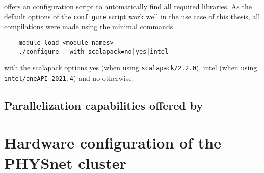 \documentclass[main.tex]{subfiles}
\begin{document}
\QE offers an configuration script to automatically find all required libraries.
As the default options of the \texttt{configure} script work well in the use case of this thesis, all compilations were made using the minimal commands
\begin{verbatim}
    module load <module names>
    ./configure --with-scalapack=no|yes|intel
\end{verbatim}
with the scalapack options yes (when using \texttt{scalapack/2.2.0}), intel (when using \\ \texttt{intel/oneAPI-2021.4}) and no otherwise.




\subsection{Parallelization capabilities offered by \QE}\label{sub:qe_parallelization}


\section{Hardware configuration of the PHYSnet cluster}

\end{document}

